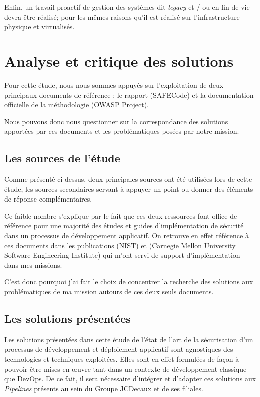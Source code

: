 Enfin, un travail proactif de gestion des systèmes dit \emph{legacy} et / ou en fin de vie devra être réalisé; pour les
mêmes raisons qu'il est réalisé sur l'infrastructure physique et virtualisés.

\newpage

\section{Analyse et critique des solutions}

Pour cette étude, nous nous sommes appuyés sur l'exploitation de deux principaux documents de référence : le rapport 
 (SAFECode) et la documentation officielle de la méthodologie 
 (OWASP Project). 

Nous pouvons donc nous questionner sur la correspondance des solutions apportées par ces documents et les 
problématiques posées par notre mission.

\subsection{Les sources de l'étude}
Comme présenté ci-dessus, deux principales sources ont été utilisées lors de cette étude, les sources secondaires servant
à appuyer un point ou donner des éléments de réponse complémentaires.

Ce faible nombre s'explique par le fait que ces deux ressources font office de référence pour une majorité des études et 
guides d'implémentation de sécurité dans un processus de développement applicatif. On retrouve en effet référence à ces
documents dans les publications  (\ac{NIST}) et 
(Carnegie Mellon University Software Engineering Institute) qui m'ont servi de support d'implémentation dans mes missions.

C'est donc  pourquoi j'ai fait le choix de concentrer la recherche des solutions aux problématiques de ma mission autours
de ces deux seuls documents.

\subsection{Les solutions présentées}
Les solutions présentées dans cette étude de l'état de l'art de la sécurisation d'un processus de développement et 
déploiement applicatif sont agnostiques des technologies et techniques exploitées. Elles sont en effet formulées de façon à
pouvoir être mises en œuvre tant dans un contexte de développement classique que DevOps.
\newline De ce fait, il sera nécessaire d'intégrer et d'adapter ces solutions aux \emph{Pipelines} présents au sein 
du Groupe JCDecaux et de ses filiales.

